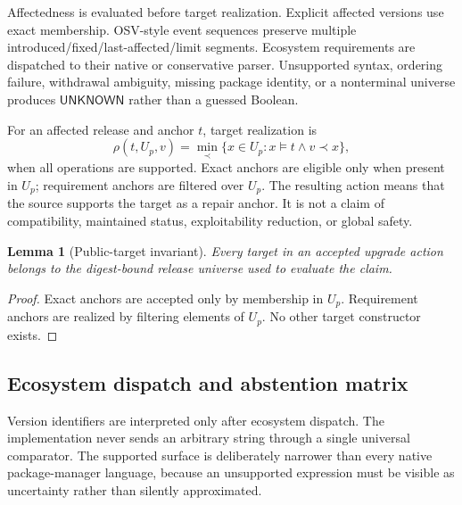 \documentclass[10pt,conference]{IEEEtran}
\newtheorem{lemma}{Lemma}
\newcommand{\unknown}{\ensuremath{\mathsf{UNKNOWN}}}
\begin{document}
Affectedness is evaluated before target realization. Explicit affected versions use exact membership. OSV-style event sequences preserve multiple introduced/fixed/last-affected/limit segments. Ecosystem requirements are dispatched to their native or conservative parser. Unsupported syntax, ordering failure, withdrawal ambiguity, missing package identity, or a nonterminal universe produces \unknown{} rather than a guessed Boolean.

For an affected release and anchor $t$, target realization is
\[
\rho(t,U_p,v)=\min_{\prec}\{x\in U_p:x\models t\land v\prec x\},
\]
when all operations are supported. Exact anchors are eligible only when present in $U_p$; requirement anchors are filtered over $U_p$. The resulting action means that the source supports the target as a repair anchor. It is not a claim of compatibility, maintained status, exploitability reduction, or global safety.

\begin{lemma}[Public-target invariant]
Every target in an accepted upgrade action belongs to the digest-bound release universe used to evaluate the claim.
\end{lemma}
\begin{proof}
Exact anchors are accepted only by membership in $U_p$. Requirement anchors are realized by filtering elements of $U_p$. No other target constructor exists.
\end{proof}


\subsection{Ecosystem dispatch and abstention matrix}
Version identifiers are interpreted only after ecosystem dispatch. The implementation never sends an arbitrary string through a single universal comparator. The supported surface is deliberately narrower than every native package-manager language, because an unsupported expression must be visible as uncertainty rather than silently approximated.
\end{document}
